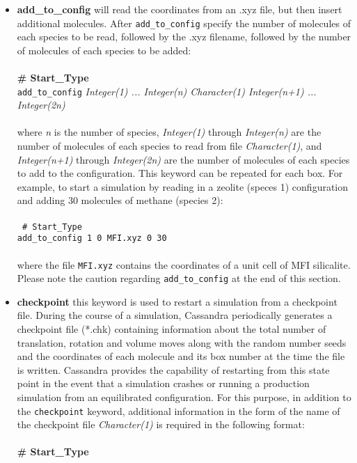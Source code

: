 \begin{itemize}
\item {\textbf{add\_to\_config}} will read the coordinates from an .xyz file, but then insert additional molecules.
After {\tt add\_to\_config} specify the number of molecules of each species to be read, followed by the .xyz filename,
followed by the number of molecules of each species to be added: \\ \\
%
{\bf \# Start\_Type} \\
{\tt add\_to\_config} {\it Integer(1) ... Integer(n) Character(1) Integer(n+1) ... Integer(2n)}\\ \\
%
where {\it n} is the number of species, {\it Integer(1)} through {\it Integer(n)} are the number of molecules of each
species to read from file {\it Character(1)}, and {\it Integer(n+1)} through {\it Integer(2n)} are the number of molecules
of each species to add to the configuration.
This keyword can be repeated for each box.
For example, to start a simulation by reading in a zeolite (speces 1) configuration and adding 30 molecules of methane (species 2): \\ \\
%
\texttt{
\# Start\_Type \\
add\_to\_config  1  0 MFI.xyz 0 30 \\} \\
%
where the file \texttt{MFI.xyz} contains the coordinates of a unit cell of MFI silicalite. \\
%
Please note the caution regarding {\tt add\_to\_config} at the end of this section. \\
%
\item \textbf{checkpoint} this keyword is used to restart a simulation from a checkpoint file.
During the course of a simulation, Cassandra periodically generates a checkpoint file (*.chk)
 containing information about the total number of translation, rotation and volume moves along with the random number seeds and
the coordinates of each molecule and its box number at the time the file is written. Cassandra provides
the capability of restarting from this state point in the event that a simulation crashes or
running a production simulation from an equilibrated configuration. For this
purpose, in addition to the {\tt checkpoint} keyword, additional information in the form of the name of
the checkpoint file {\it Character(1)} is required in the following format: \\ \\
%
{\bf \# Start\_Type} \\

\end{itemize}
